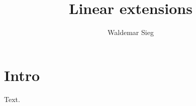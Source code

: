 \documentclass{elsarticle}
\makeatletter
\newcommand{\subjclass}[2][2010]{%
  \let\@oldtitle\@title
  \gdef\@title{\@oldtitle\footnotetext{#1 \emph{Mathematics subject classification.} #2}}}
\makeatother
\begin{document}
\begin{frontmatter}
\title{Linear extensions}
\author{Waldemar Sieg}
\subjclass{Primary: 26A15.}
\maketitle
\end{frontmatter}
\section{Intro}
Text.
\end{document}
